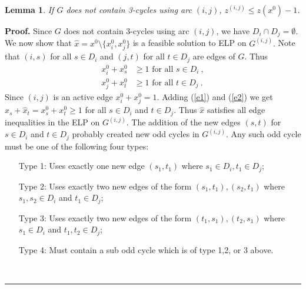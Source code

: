 \documentclass[12pt]{article}
\newtheorem{lemma}{Lemma}
\newenvironment{proof}[1][Proof]{\textbf{#1.} }{\ \rule{0.5em}{0.5em}}
\begin{document}
\begin{lemma}\label{a1} If $G$ does not contain 3-cycles using arc $(i,j)$, $z^{(i,j)}\leq z(x^0)-1$.\end{lemma}
\begin{proof}Since $G$ does not contain 3-cycles using arc $(i,j)$, we have $D_i\cap
D_j=\emptyset$. We now show that
$\hat{x}=x^0\setminus\{x^0_i,x^0_j\}$ is a feasible solution to ELP
on $G^{(i,j)}.$ Note that $(i,s)$ for all $s\in D_i$ and $(j,t)$ for
all $t\in D_j$ are edges of $G$. Thus
\begin{eqnarray} x^0_i+x^0_s &
\geq 1 \mbox{ for all } s\in D_i\ ,\label{e1}\\
x^0_j+x^0_t & \geq 1 \mbox{ for all } t\in
D_j\ .\label{e2}\end{eqnarray}
Since $(i,j)$ is an active edge
$x^0_i+x^0_j=1$. Adding (\ref{e1}) and (\ref{e2}) we get
$\hat{x}_s+\hat{x}_t=x^0_s+x^0_t \geq 1$ for all $s\in D_i$ and
$t\in D_j$. Thus $\hat{x}$ satisfies all edge inequalities in the
ELP on $G^{(i,j)}.$ The addition of the new edges $(s,t)$ for
$s\in D_i$ and $t\in D_j$ probably created new odd cycles in
$G^{(i,j)}$. Any such odd cycle must be one of the following four
types:
\begin{itemize}
\item[Type 1:] Uses exactly one new edge $(s_1,t_1)$ where $s_1 \in D_i, t_1\in D_j$;
\item[Type 2:] Uses exactly two new edges of the form $(s_1,t_1), (s_2,t_1)$
where $s_1,s_2 \in D_i$ and $t_1 \in D_j$;
\item[Type 3:] Uses exactly two new edges of the form $(t_1,s_1), (t_2,s_1)$
where $s_1 \in D_i$ and $t_1,t_2 \in D_j$;
\item[Type 4:] Must contain a sub odd cycle which is of type 1,2, or
3 above.
\end{itemize}



\end{proof}
\end{document}
